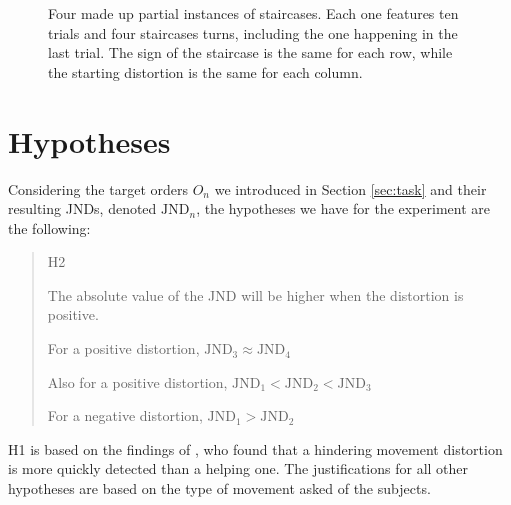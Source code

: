 \begin{figure}[h]
    \caption{Four made up partial instances of staircases. Each one features ten trials and four staircases turns, including the one happening in the last trial. The sign of the staircase is the same for each row, while the starting distortion is the same for each column.}\label{fig:trials}
\end{figure}

\section{Hypotheses}

Considering the target orders $O_n$  we introduced in Section \ref{sec:task} and their resulting JNDs, denoted $\text{JND}_n$, the hypotheses we have for the experiment are the following:

\begin{quote}
    \begin{labeling}[:]{H2}
      \item [H1] The absolute value of the JND will be higher when the distortion is positive.
      \item [H2] For a positive distortion, $\text{JND}_3 \approx \text{JND}_4$
      \item [H3] Also for a positive distortion, $\text{JND}_1 < \text{JND}_2 < \text{JND}_3$
      \item [H4] For a negative distortion, $\text{JND}_1 > \text{JND}_2$
    \end{labeling}
\end{quote}

H1 is based on the findings of \cite{debarba2017embodiment}, who found that a hindering movement distortion is more quickly detected than a helping one. The justifications for all other hypotheses are based on the type of movement asked of the subjects.

